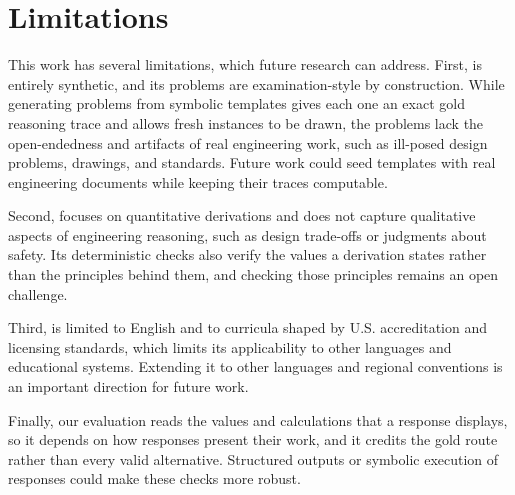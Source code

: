 \section*{Limitations}
\label{sec:limitations}

This work has several limitations, which future research can address.
First, \ourdataset is entirely synthetic, and its problems are examination-style by construction.
While generating problems from symbolic templates gives each one an exact gold reasoning trace and
allows fresh instances to be drawn, the problems lack the open-endedness and artifacts of real
engineering work, such as ill-posed design problems, drawings, and standards.
Future work could seed templates with real engineering documents while keeping their traces
computable.

Second, \ourdataset focuses on quantitative derivations and does not capture qualitative aspects of
engineering reasoning, such as design trade-offs or judgments about safety.
Its deterministic checks also verify the values a derivation states rather than the principles
behind them, and checking those principles remains an open challenge.

Third, \ourdataset is limited to English and to curricula shaped by U.S. accreditation and licensing
standards, which limits its applicability to other languages and educational systems.
Extending it to other languages and regional conventions is an important direction for future work.

Finally, our evaluation reads the values and calculations that a response displays, so it depends on
how responses present their work, and it credits the gold route rather than every valid alternative.
Structured outputs or symbolic execution of responses could make these checks more robust.
